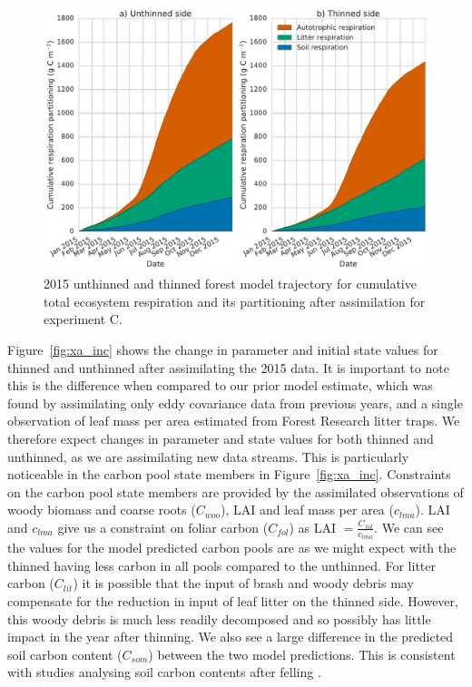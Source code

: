\documentclass[draft,linenumbers]{agujournal}
\begin{document}
\begin{figure}[ht]
    \centering
        \includegraphics[width=\textwidth]{resp_partc.pdf}
    \caption{2015 unthinned and thinned forest model trajectory for cumulative total ecosystem respiration and its partitioning after assimilation for experiment C.} \label{fig:rt_part}
\end{figure}

Figure~\ref{fig:xa_inc} shows the change in parameter and initial state values for thinned and unthinned after assimilating the 2015 data. It is important to note this is the difference when compared to our prior model estimate, which was found by assimilating only eddy covariance data from previous years, and a single observation of leaf mass per area estimated from Forest Research litter traps. We therefore expect changes in parameter and state values for both thinned and unthinned, as we are assimilating new data streams. This is particularly noticeable in the carbon pool state members in Figure~\ref{fig:xa_inc}. Constraints on the carbon pool state members are provided by the assimilated observations of woody biomass and coarse roots (\(C_{woo}\)), LAI and leaf mass per area (\(c_{lma}\)). LAI and \(c_{lma}\) give us a constraint on foliar carbon (\(C_{fol}\)) as LAI \(= \frac{C_{fol}}{c_{lma}} \). We can see the values for the model predicted carbon pools are as we might expect with the thinned having less carbon in all pools compared to the unthinned. For litter carbon (\(C_{lit}\)) it is possible that the input of brash and woody debris may compensate for the reduction in input of leaf litter on the thinned side. However, this woody debris is much less readily decomposed and so possibly has little impact in the year after thinning. We also see a large difference in the predicted soil carbon content (\(C_{som}\)) between the two model predictions. This is consistent with studies analysing soil carbon contents after felling \citep{Hernesmaa2005777}. 
\end{document}
